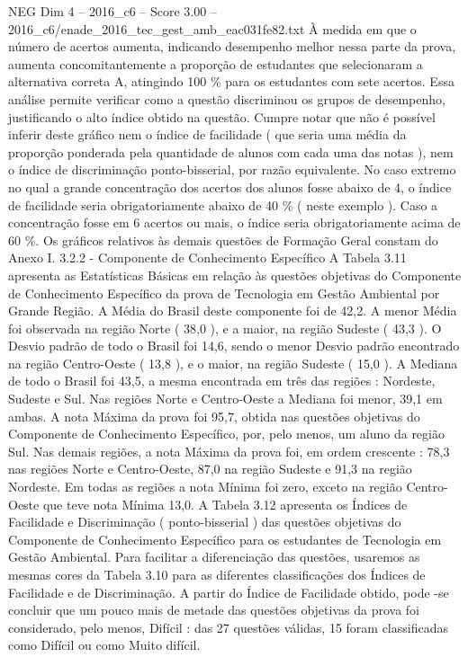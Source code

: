 \begin{textsample}{NEG Dim 4 – 2016\_c6 – Score 3.00 – 2016\_c6/enade\_2016\_tec\_gest\_amb\_eac031fe82.txt}
À medida em que o número de acertos aumenta, indicando desempenho melhor nessa parte da prova, aumenta concomitantemente a proporção de estudantes que selecionaram a alternativa correta A, atingindo 100 \% para os estudantes com sete acertos.
Essa análise permite verificar como a questão discriminou os grupos de desempenho, justificando o alto índice obtido na questão.
Cumpre notar que não é possível inferir deste gráfico nem o índice de facilidade ( que seria uma média da proporção ponderada pela quantidade de alunos com cada uma das notas ), nem o índice de discriminação ponto-bisserial, por razão equivalente.
No caso extremo no qual a grande concentração dos acertos dos alunos fosse abaixo de 4, o índice de facilidade seria obrigatoriamente abaixo de 40 \% ( neste exemplo ).
Caso a concentração fosse em 6 acertos ou mais, o índice seria obrigatoriamente acima de 60 \%.
Os gráficos relativos às demais questões de Formação Geral constam do Anexo I. 3.2.2 - Componente de Conhecimento Específico A Tabela 3.11 apresenta as Estatísticas Básicas em relação às questões objetivas do Componente de Conhecimento Específico da prova de Tecnologia em Gestão Ambiental por Grande Região.
A Média do Brasil deste componente foi de 42,2.
A menor Média foi observada na região Norte ( 38,0 ), e a maior, na região Sudeste ( 43,3 ).
O Desvio padrão de todo o Brasil foi 14,6, sendo o menor Desvio padrão encontrado na região Centro-Oeste ( 13,8 ), e o maior, na região Sudeste ( 15,0 ).
A Mediana de todo o Brasil foi 43,5, a mesma encontrada em três das regiões : Nordeste, Sudeste e Sul.
Nas regiões Norte e Centro-Oeste a Mediana foi menor, 39,1 em ambas.
A nota Máxima da prova foi 95,7, obtida nas questões objetivas do Componente de Conhecimento Específico, por, pelo menos, um aluno da região Sul.
Nas demais regiões, a nota Máxima da prova foi, em ordem crescente : 78,3 nas regiões Norte e Centro-Oeste, 87,0 na região Sudeste e 91,3 na região Nordeste.
Em todas as regiões a nota Mínima foi zero, exceto na região Centro-Oeste que teve nota Mínima 13,0.
A Tabela 3.12 apresenta os Índices de Facilidade e Discriminação ( ponto-bisserial ) das questões objetivas do Componente de Conhecimento Específico para os estudantes de Tecnologia em Gestão Ambiental.
Para facilitar a diferenciação das questões, usaremos as mesmas cores da Tabela 3.10 para as diferentes classificações dos Índices de Facilidade e de Discriminação.
A partir do Índice de Facilidade obtido, pode -se concluir que um pouco mais de metade das questões objetivas da prova foi considerado, pelo menos, Difícil : das 27 questões válidas, 15 foram classificadas como Difícil ou como Muito difícil.

\end{textsample}
